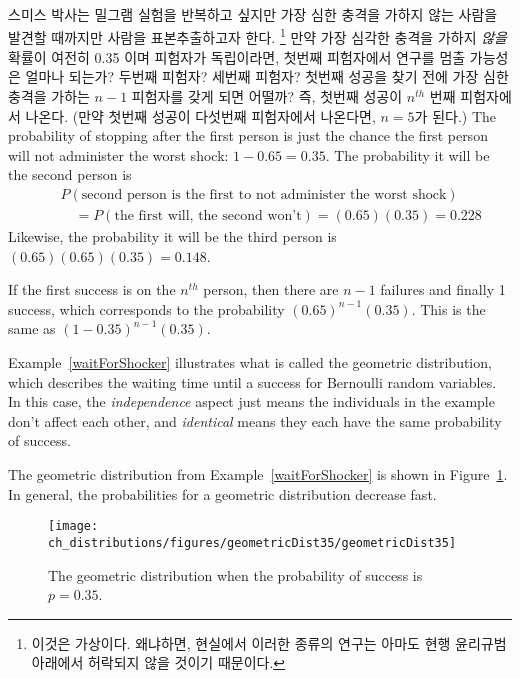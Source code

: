 \begin{example}{스미스 박사는 밀그램 실험을 반복하고 싶지만 가장 심한 충격을 가하지 않는 사람을 발견할 때까지만 사람을 표본추출하고자 한다. \footnote{이것은 가상이다. 왜냐하면, 현실에서 이러한 종류의 연구는 아마도 현행 윤리규범 아래에서 허락되지 않을 것이기 때문이다.}
만약 가장 심각한 충격을 가하지 \emph{않을} 확률이 여전히 0.35 이며 피험자가 독립이라면, 첫번째 피험자에서 연구를 멈출 가능성은 얼마나 되는가? 두번째 피험자? 세번째 피험자? 첫번째 성공을 찾기 전에 가장 심한 충격을 가하는 $n-1$ 피험자를 갖게 되면 어떨까? 즉, 첫번째 성공이 $n^{th}$ 번째 피험자에서 나온다. (만약 첫번째 성공이 다섯번째 피험자에서 나온다면, $n=5$가 된다.)} \label{waitForShocker}
The probability of stopping after the first person is just the chance the first person will not administer the worst shock: $1-0.65=0.35$. The probability it will be the second person is
\begin{eqnarray*}
&&P(\text{second person is the first to not administer the worst shock}) \\
&&\quad = P(\text{the first will, the second won't}) = (0.65)(0.35) = 0.228
\end{eqnarray*}
Likewise, the probability it will be the third person is $(0.65)(0.65)(0.35) = 0.148$.

If the first success is on the $n^{th}$ person, then there are $n-1$ failures and finally 1 success, which corresponds to the probability $(0.65)^{n-1}(0.35)$. This is the same as $(1-0.35)^{n-1}(0.35)$.
\end{example}

Example~\ref{waitForShocker} illustrates what is called the geometric distribution, which describes the waiting time until a success for  Bernoulli random variables. In this case, the \emph{independence} aspect just means the individuals in the example don't affect each other, and \emph{identical} means they each have the same probability of success.

The geometric distribution from Example~\ref{waitForShocker} is shown in Figure~\ref{geometricDist35}. In general, the probabilities for a geometric distribution decrease  fast.

\begin{figure}
\centering
\texttt{[image: ch\_distributions/figures/geometricDist35/geometricDist35]}
\caption{The geometric distribution when the probability of success is $p=0.35$.}
\label{geometricDist35}
\end{figure}

